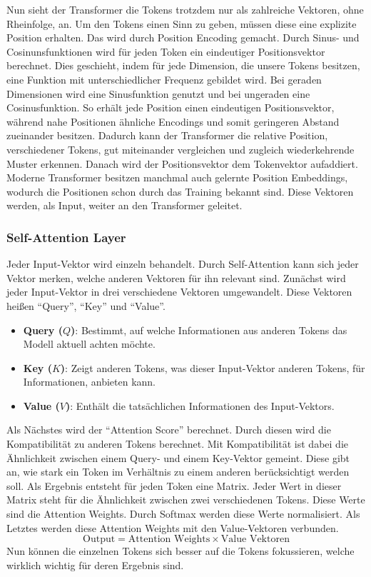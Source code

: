 Nun sieht der Transformer die Tokens trotzdem nur als zahlreiche Vektoren, ohne Rheinfolge, an.
Um den Tokens einen Sinn zu geben, müssen diese eine explizite Position erhalten.
Das wird durch Position Encoding gemacht.
Durch Sinus- und Cosinunsfunktionen wird für jeden Token ein eindeutiger Positionsvektor berechnet.
Dies geschieht, indem für jede Dimension, die unsere Tokens besitzen, eine Funktion mit unterschiedlicher Frequenz gebildet wird.
Bei geraden Dimensionen wird eine Sinusfunktion genutzt und bei ungeraden eine Cosinusfunktion.
So erhält jede Position einen eindeutigen Positionsvektor,
während nahe Positionen ähnliche Encodings und somit geringeren Abstand zueinander besitzen.
Dadurch kann der Transformer die relative Position, verschiedener Tokens,
gut miteinander vergleichen und zugleich wiederkehrende Muster erkennen.
Danach wird der Positionsvektor dem Tokenvektor aufaddiert.
Moderne Transformer besitzen manchmal auch gelernte Position Embeddings,
wodurch die Positionen schon durch das Training bekannt sind.
Diese Vektoren werden, als Input, weiter an den Transformer geleitet.

\subsubsection{Self-Attention Layer}
Jeder Input-Vektor wird einzeln behandelt.
Durch Self-Attention kann sich jeder Vektor merken, welche anderen Vektoren für ihn relevant sind.
Zunächst wird jeder Input-Vektor in drei verschiedene Vektoren umgewandelt.
Diese Vektoren heißen \enquote{Query}, \enquote{Key} und \enquote{Value}.
\begin{itemize}
  \item \textbf{Query ($Q$)}: Bestimmt, auf welche Informationen aus anderen Tokens das Modell aktuell achten möchte.
  \item \textbf{Key ($K$)}: Zeigt anderen Tokens, was dieser Input-Vektor anderen Tokens, für Informationen, anbieten kann.
  \item \textbf{Value ($V$)}: Enthält die tatsächlichen Informationen des Input-Vektors.
\end{itemize}
Als Nächstes wird der \enquote{Attention Score} berechnet.
Durch diesen wird die Kompatibilität zu anderen Tokens berechnet.
Mit Kompatibilität ist dabei die Ähnlichkeit zwischen einem Query- und einem Key-Vektor gemeint.
Diese gibt an, wie stark ein Token im Verhältnis zu einem anderen berücksichtigt werden soll.
Als Ergebnis entsteht für jeden Token eine Matrix.
Jeder Wert in dieser Matrix steht für die Ähnlichkeit zwischen zwei verschiedenen Tokens.
Diese Werte sind die Attention Weights.
Durch Softmax werden diese Werte normalisiert.
Als Letztes werden diese Attention Weights mit den Value-Vektoren verbunden.
\[
\text{Output} = \text{Attention Weights} \times \text{Value Vektoren}
\]
Nun können die einzelnen Tokens sich besser auf die Tokens fokussieren, welche wirklich wichtig für deren Ergebnis sind.

